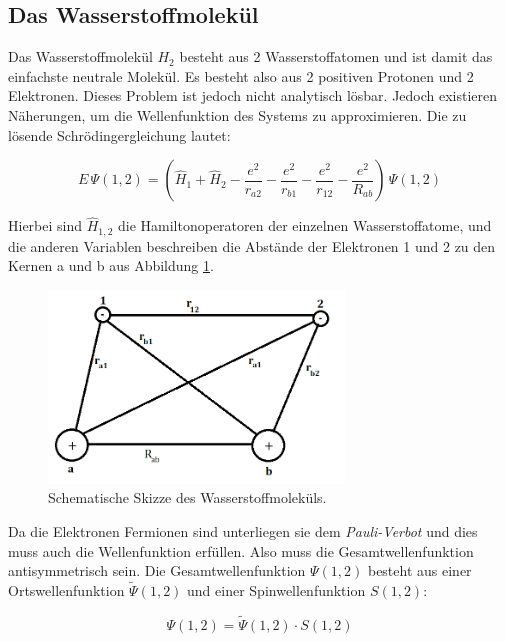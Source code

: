 \subsection{Das Wasserstoffmolekül}
\label{sec:H2}

Das Wasserstoffmolekül $H_2$ besteht aus 2 Wasserstoffatomen und ist damit das einfachste neutrale Molekül. Es besteht also aus 2 positiven Protonen und 2 Elektronen. Dieses Problem ist jedoch nicht analytisch lösbar. Jedoch existieren Näherungen, um die Wellenfunktion des Systems zu approximieren. Die zu lösende Schrödingergleichung lautet:

\begin{equation}
    E \, \Psi (1, 2) = \left( \hat{H}_1 + \hat{H}_2 - \frac{e^2}{r_{a2}} - \frac{e^2}{r_{b1}} - \frac{e^2}{r_{12}} - \frac{e^2}{R_{ab}} \right) \, \Psi (1, 2)
    \label{eqn:H2}
\end{equation}

Hierbei sind $\hat{H}_{1,2}$ die Hamiltonoperatoren der einzelnen Wasserstoffatome, und die anderen Variablen beschreiben die Abstände der Elektronen 1 und 2 zu den Kernen a und b aus Abbildung \ref{fig:H2}.

\begin{figure}[H]
    \centering
    \includegraphics[width=0.7\textwidth]{H2.PNG}
    \caption{Schematische Skizze des Wasserstoffmoleküls.}
    \label{fig:H2}
\end{figure}

Da die Elektronen Fermionen sind unterliegen sie dem \textit{Pauli-Verbot} und dies muss auch die Wellenfunktion erfüllen. Also muss die Gesamtwellenfunktion antisymmetrisch sein. Die Gesamtwellenfunktion $\Psi (1,2)$ besteht aus einer Ortswellenfunktion $\tilde{\Psi} (1,2)$ und einer Spinwellenfunktion $S (1,2)$:

\begin{equation}
    \Psi (1,2) = \tilde{\Psi} (1,2) \cdot S (1,2)
    \label{eqn:gesamt}
\end{equation}


